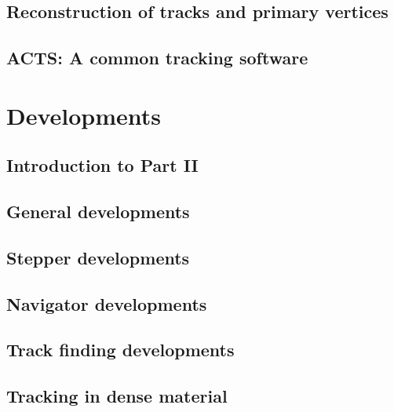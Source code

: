 \documentclass[12pt,a4paper,bibliography=totoc,BCOR=10mm]{scrreprt} %
\begin{document}
\chapter{Reconstruction of tracks and primary vertices}
\label{ch:intro/reco}


\chapter{ACTS: A common tracking software}
\label{ch:intro/acts}


\part{Developments}
\label{pt:developments}

\chapter*{Introduction to Part II}


\chapter{General developments}
\label{ch:dev/general}


\chapter{Stepper developments}
\label{ch:dev/stepper}


\chapter{Navigator developments}
\label{ch:dev/navigator}


\chapter{Track finding developments}
\label{ch:dev/track_finding}


\chapter{Tracking in dense material}
\label{ch:dev/dense}

\end{document}
